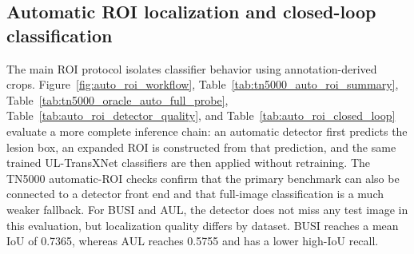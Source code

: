 \begin{table}[t]
    \centering
    \small
    \caption{Effect of enabling MCA in the final GGG configuration. Mean and standard deviation are computed over TN5000 seeds or BUSI/AUL folds.}
    \label{tab:mca_effect}
\end{table}

\subsection{Automatic ROI localization and closed-loop classification}
The main ROI protocol isolates classifier behavior using annotation-derived crops. Figure~\ref{fig:auto_roi_workflow}, Table~\ref{tab:tn5000_auto_roi_summary}, Table~\ref{tab:tn5000_oracle_auto_full_probe}, Table~\ref{tab:auto_roi_detector_quality}, and Table~\ref{tab:auto_roi_closed_loop} evaluate a more complete inference chain: an automatic detector first predicts the lesion box, an expanded ROI is constructed from that prediction, and the same trained UL-TransXNet classifiers are then applied without retraining. The TN5000 automatic-ROI checks confirm that the primary benchmark can also be connected to a detector front end and that full-image classification is a much weaker fallback. For BUSI and AUL, the detector does not miss any test image in this evaluation, but localization quality differs by dataset. BUSI reaches a mean IoU of 0.7365, whereas AUL reaches 0.5755 and has a lower high-IoU recall.

